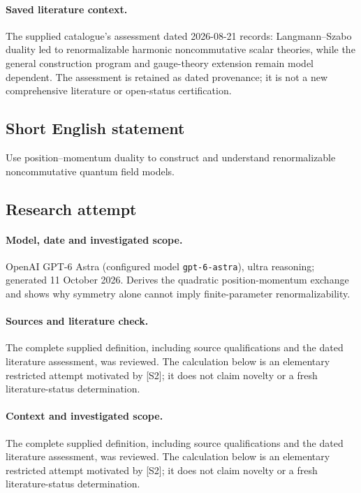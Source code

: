 \documentclass[11pt]{article}
\begin{document}
\paragraph{Saved literature context.} The supplied catalogue's assessment dated 2026-08-21 records: Langmann--Szabo duality led to renormalizable harmonic noncommutative scalar theories, while the general construction program and gauge-theory extension remain model dependent. The assessment is retained as dated provenance; it is not a new comprehensive literature or open-status certification.
\subsection{Short English statement}
Use position--momentum duality to construct and understand renormalizable noncommutative quantum field models.
\subsection{Research attempt}
\paragraph{Model, date and investigated scope.}
OpenAI GPT-6 Astra (configured model \texttt{gpt-6-astra}), ultra reasoning; generated 11 October 2026. Derives the quadratic position-momentum exchange and shows why symmetry alone cannot imply finite-parameter renormalizability.

\paragraph{Sources and literature check.}
The complete supplied definition, including source qualifications and the dated literature assessment, was reviewed. The calculation below is an elementary restricted attempt motivated by [S2]; it does not claim novelty or a fresh literature-status determination.

\paragraph{Context and investigated scope.} The complete supplied definition, including source qualifications and the dated literature assessment, was reviewed. The calculation below is an elementary restricted attempt motivated by [S2]; it does not claim novelty or a fresh literature-status determination.
\end{document}
